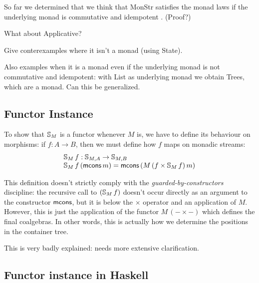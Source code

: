 \documentclass{article}
\begin{document}
So far we determined that we think that MonStr satisfies the monad laws if the underlying monad is commutative and idempotent \cite{idempotent_monads}. (Proof?)

What about Applicative?

Give conterexamples where it isn't a monad (using State).

Also examples when it is a monad even if the underlying monad is not commutative and idempotent: with List as underlying monad we obtain Trees, which are a monad. Can this be generalized.

\subsection{Functor Instance}

To show that $\mathbb{S}_{M}$ is a functor whenever $M$ is, we have to define its behaviour on morphisms: if $f:A\rightarrow B$, then we must define how $f$ maps on monadic streams:
$$
\begin{array}{l}
\mathbb{S}_{M}\,f : \mathbb{S}_{M,A} \rightarrow \mathbb{S}_{M,B}\\
\mathbb{S}_{M}\,f\,(\mathsf{mcons}\,m) = \mathsf{mcons}\,(M\,(f\times \mathbb{S}_{M}\,f)\,m)
\end{array}
$$

This definition doesn't strictly comply with the {\em guarded-by-constructors} discipline: the recursive call to $(\mathbb{S}_{M}\,f)$ doesn't occur directly as an argument to the constructor $\mathsf{mcons}$, but it is below the $\times$ operator and an application of $M$.
However, this is just the application of the functor $M\,(- \times -)$ which defines the final coalgebras. In other words, this is actually how we determine the positions in the container tree.
\begin{vcomment}
	This is very badly explained: needs more extensive clarification.
\end{vcomment}
















\subsection{Functor instance in Haskell}

\end{document}
